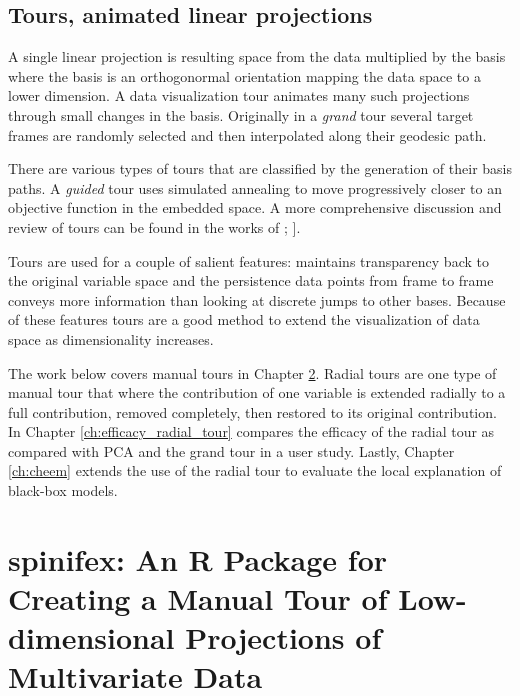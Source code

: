 \documentclass{template/monashthesis}
\begin{document}
\hypertarget{tours-animated-linear-projections}{%
\section{Tours, animated linear projections}\label{tours-animated-linear-projections}}

A single linear projection is resulting space from the data multiplied by the basis where the basis is an orthogonormal orientation mapping the data space to a lower dimension. A data visualization tour animates many such projections through small changes in the basis. Originally in a \emph{grand} tour \autocite{asimov_grand_1985} several target frames are randomly selected and then interpolated along their geodesic path.



There are various types of tours that are classified by the generation of their basis paths. A \emph{guided} tour uses simulated annealing to move progressively closer to an objective function in the embedded space\autocite{hurley_analyzing_1990}. A more comprehensive discussion and review of tours can be found in the works of \textcite{cook_grand_2008}; \textcite{lee_review_2021}{]}.

Tours are used for a couple of salient features: maintains transparency back to the original variable space and the persistence data points from frame to frame conveys more information than looking at discrete jumps to other bases. Because of these features tours are a good method to extend the visualization of data space as dimensionality increases.

The work below covers manual tours \autocite{cook_manual_1997,spyrison_spinifex_2020} in Chapter \ref{ch:spinifex}. Radial tours are one type of manual tour that where the contribution of one variable is extended radially to a full contribution, removed completely, then restored to its original contribution. In Chapter \ref{ch:efficacy_radial_tour} compares the efficacy of the radial tour as compared with PCA and the grand tour in a user study. Lastly, Chapter \ref{ch:cheem} extends the use of the radial tour to evaluate the local explanation of black-box models.

\hypertarget{ch:spinifex}{%
\chapter{spinifex: An R Package for Creating a Manual Tour of Low-dimensional Projections of Multivariate Data}\label{ch:spinifex}}
\end{document}
